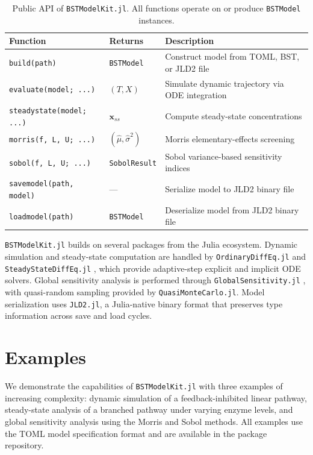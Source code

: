 \documentclass[11pt]{article}
\begin{document}
\begin{table}[ht]
    \centering
    \caption{Public API of \texttt{BSTModelKit.jl}. All functions operate on or produce \texttt{BSTModel} instances.}
    \label{tab:api}
    \small
    \begin{tabular}{lll}
        \toprule
        \textbf{Function} & \textbf{Returns} & \textbf{Description} \\
        \midrule
        \texttt{build(path)} & \texttt{BSTModel} & Construct model from TOML, BST, or JLD2 file \\
        \texttt{evaluate(model; ...)} & $(T, X)$ & Simulate dynamic trajectory via ODE integration \\
        \texttt{steadystate(model; ...)} & $\mathbf{x}_{ss}$ & Compute steady-state concentrations \\
        \texttt{morris(f, L, U; ...)} & $(\hat{\mu}, \hat{\sigma}^2)$ & Morris elementary-effects screening \\
        \texttt{sobol(f, L, U; ...)} & \texttt{SobolResult} & Sobol variance-based sensitivity indices \\
        \texttt{savemodel(path, model)} & --- & Serialize model to JLD2 binary file \\
        \texttt{loadmodel(path)} & \texttt{BSTModel} & Deserialize model from JLD2 binary file \\
        \bottomrule
    \end{tabular}
\end{table}

\texttt{BSTModelKit.jl} builds on several packages from the Julia ecosystem. Dynamic simulation and steady-state computation are handled by \texttt{OrdinaryDiffEq.jl} and \texttt{SteadyStateDiffEq.jl} \citep{Rackauckas2017}, which provide adaptive-step explicit and implicit ODE solvers. Global sensitivity analysis is performed through \texttt{GlobalSensitivity.jl} \citep{Dixit2022}, with quasi-random sampling provided by \texttt{QuasiMonteCarlo.jl}. Model serialization uses \texttt{JLD2.jl}, a Julia-native binary format that preserves type information across save and load cycles.

\section{Examples}\label{sec:examples}
We demonstrate the capabilities of \texttt{BSTModelKit.jl} with three examples of increasing complexity: dynamic simulation of a feedback-inhibited linear pathway, steady-state analysis of a branched pathway under varying enzyme levels, and global sensitivity analysis using the Morris and Sobol methods. All examples use the TOML model specification format and are available in the package repository.
\end{document}
